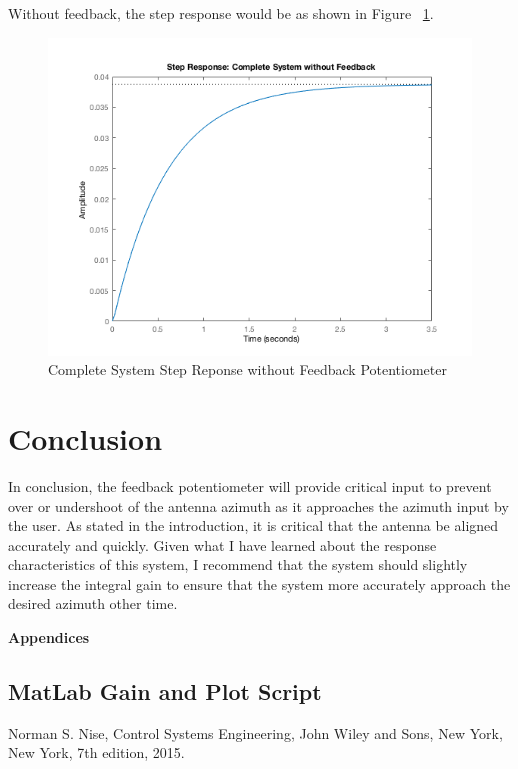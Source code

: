 \documentclass[12pt]{article}
\begin{document}
Without feedback, the step response would be as shown in Figure ~\ref{fig:completewo}.

\begin{figure}[H]
\begin{center}
	\includegraphics[width=\textwidth]{./img/CompleteStepNoFeedback.png}
	\caption{\label{fig:completewo}Complete System Step Reponse without Feedback Potentiometer}
\end{center}
\end{figure}

\section{Conclusion}

In conclusion, the feedback potentiometer will provide critical input to prevent over or undershoot of the antenna azimuth as it approaches the azimuth input by the user. As stated in the introduction, it is critical that the antenna be aligned accurately and quickly. Given what I have learned about the response characteristics of this system, I recommend that the system should slightly increase the integral gain to ensure that the system more accurately approach the desired azimuth other time.

\pagebreak

\textbf{Appendices}

\begin{appendices}

\section{MatLab Gain and Plot Script}



\end{appendices}

\begin{thebibliography}{9}

  Norman S. Nise,
  Control Systems Engineering,
  John Wiley and Sons, New York, New York,
  7th edition,
  2015.

\end{thebibliography}
\end{document}
